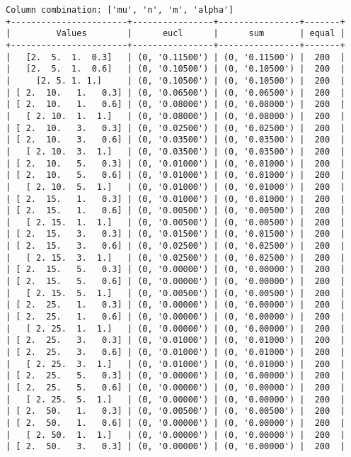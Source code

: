 \documentclass{article}
\begin{document}
\begin{verbatim}
Column combination: ['mu', 'n', 'm', 'alpha']
+-----------------------+----------------+----------------+-------+
|         Values        |      eucl      |      sum       | equal |
+-----------------------+----------------+----------------+-------+
|   [2.  5.  1.  0.3]   | (0, '0.11500') | (0, '0.11500') |  200  |
|   [2.  5.  1.  0.6]   | (0, '0.10500') | (0, '0.10500') |  200  |
|     [2. 5. 1. 1.]     | (0, '0.10500') | (0, '0.10500') |  200  |
| [ 2.  10.   1.   0.3] | (0, '0.06500') | (0, '0.06500') |  200  |
| [ 2.  10.   1.   0.6] | (0, '0.08000') | (0, '0.08000') |  200  |
|   [ 2. 10.  1.  1.]   | (0, '0.08000') | (0, '0.08000') |  200  |
| [ 2.  10.   3.   0.3] | (0, '0.02500') | (0, '0.02500') |  200  |
| [ 2.  10.   3.   0.6] | (0, '0.03500') | (0, '0.03500') |  200  |
|   [ 2. 10.  3.  1.]   | (0, '0.03500') | (0, '0.03500') |  200  |
| [ 2.  10.   5.   0.3] | (0, '0.01000') | (0, '0.01000') |  200  |
| [ 2.  10.   5.   0.6] | (0, '0.01000') | (0, '0.01000') |  200  |
|   [ 2. 10.  5.  1.]   | (0, '0.01000') | (0, '0.01000') |  200  |
| [ 2.  15.   1.   0.3] | (0, '0.01000') | (0, '0.01000') |  200  |
| [ 2.  15.   1.   0.6] | (0, '0.00500') | (0, '0.00500') |  200  |
|   [ 2. 15.  1.  1.]   | (0, '0.00500') | (0, '0.00500') |  200  |
| [ 2.  15.   3.   0.3] | (0, '0.01500') | (0, '0.01500') |  200  |
| [ 2.  15.   3.   0.6] | (0, '0.02500') | (0, '0.02500') |  200  |
|   [ 2. 15.  3.  1.]   | (0, '0.02500') | (0, '0.02500') |  200  |
| [ 2.  15.   5.   0.3] | (0, '0.00000') | (0, '0.00000') |  200  |
| [ 2.  15.   5.   0.6] | (0, '0.00000') | (0, '0.00000') |  200  |
|   [ 2. 15.  5.  1.]   | (0, '0.00500') | (0, '0.00500') |  200  |
| [ 2.  25.   1.   0.3] | (0, '0.00000') | (0, '0.00000') |  200  |
| [ 2.  25.   1.   0.6] | (0, '0.00000') | (0, '0.00000') |  200  |
|   [ 2. 25.  1.  1.]   | (0, '0.00000') | (0, '0.00000') |  200  |
| [ 2.  25.   3.   0.3] | (0, '0.01000') | (0, '0.01000') |  200  |
| [ 2.  25.   3.   0.6] | (0, '0.01000') | (0, '0.01000') |  200  |
|   [ 2. 25.  3.  1.]   | (0, '0.01000') | (0, '0.01000') |  200  |
| [ 2.  25.   5.   0.3] | (0, '0.00000') | (0, '0.00000') |  200  |
| [ 2.  25.   5.   0.6] | (0, '0.00000') | (0, '0.00000') |  200  |
|   [ 2. 25.  5.  1.]   | (0, '0.00000') | (0, '0.00000') |  200  |
| [ 2.  50.   1.   0.3] | (0, '0.00500') | (0, '0.00500') |  200  |
| [ 2.  50.   1.   0.6] | (0, '0.00000') | (0, '0.00000') |  200  |
|   [ 2. 50.  1.  1.]   | (0, '0.00000') | (0, '0.00000') |  200  |
| [ 2.  50.   3.   0.3] | (0, '0.00000') | (0, '0.00000') |  200  |

\end{verbatim}
\end{document}
